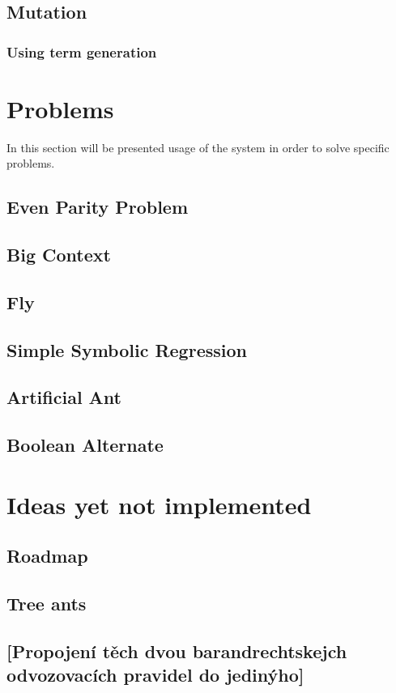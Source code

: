 \documentclass[12pt,a4paper]{report}
\begin{document}
\section{Mutation}
	\subsection{Using term generation}


\chapter{Problems}
	In this section will be presented usage of the system in order to solve specific problems.
		
	
		\section{Even Parity Problem}
		\section{Big Context}
		\section{Fly}
		\section{Simple Symbolic Regression}
		\section{Artificial Ant}
		\section{Boolean Alternate}
	
\chapter{Ideas yet not implemented}

\section{Roadmap}
\section{Tree ants}
\section{[Propojení těch dvou barandrechtskejch odvozovacích pravidel do jedinýho]}
\end{document}
